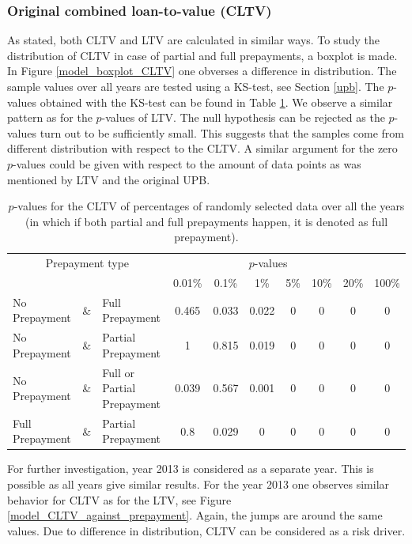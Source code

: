     \subsubsection{Original combined loan-to-value (CLTV)}
        As stated, both CLTV and LTV are calculated in similar ways. 
        To study the distribution of CLTV in case of partial and full 
        prepayments, a boxplot is made. In Figure \ref{model_boxplot_CLTV} 
        one obverses a difference in distribution. The sample values over all years are tested using a KS-test, see Section \ref{upb}. The $p$-values obtained with the KS-test can be found in Table
        \ref{model_Pvals_of_CLTV}. We observe a similar pattern as for the $p$-values of LTV. The null hypothesis can be rejected as the $p$-values turn out to be sufficiently small. This suggests that the samples come from different distribution with respect to the CLTV. 
        A similar argument for the zero $p$-values could 
        be given with respect to the amount of data points as was mentioned by LTV and the original UPB.
        \begin{table}[H]
        \centering
            \begin{tabular}{lcl|c|c|c|c|c|c|c}
                \multicolumn{3}{c|}{Prepayment type} 
                & \multicolumn{6}{c}{$p$-values}& \\
                &&&0.01\%&0.1\%&1\%&5\%&10\%&20\%&100\%\\\hline
                No Prepayment & \& & Full Prepayment & 0.465 & 0.033&0.022&0&0&0&0\\
                No Prepayment & \& & Partial Prepayment & 1 & 0.815&0.019&0&0&0&0\\
                No Prepayment & \& & Full or Partial Prepayment & 0.039 & 0.567&0.001&0&0&0&0 \\
                Full Prepayment & \& & Partial Prepayment & 0.8 & 0.029&0&0&0&0&0
		    \end{tabular}
            \caption{
                $p$-values for the CLTV of percentages of randomly selected data over all the years (in which if both partial and full 
                prepayments happen, it is denoted as full prepayment).
                }
	        \label{model_Pvals_of_CLTV}
        \end{table}
        For further investigation, year 2013 is considered 
        as a separate year. This is possible as all years give
        similar results. 
        For the year 2013 one observes similar behavior 
        for CLTV as for the LTV, see Figure \ref{model_CLTV_against_prepayment}. Again, the jumps are around the same values. Due to difference in distribution, CLTV can be considered as a risk driver.
